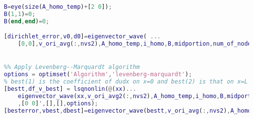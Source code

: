 \begin{lstlisting}[language=Matlab,caption=The Levenberg--Marquardt algorithm iteratively finds optimal macroscale Robin boundary conditions., label=matn1]
B=eye(size(A_homo_temp)+[2 0]);
B(1,1)=0;
B(end,end)=0;

[dirichlet_error,v0,d0]=eigenvector_wave( ...
    [0,0],v_ori_avg(:,nvs2),A_homo_temp,i_homo,B,midportion,num_of_node_in_a_period_perlayer);


%% Apply Levenberg--Marquardt algorithm
options = optimset('Algorithm','levenberg-marquardt');
% best(1) is the coefficient of dudx on x=0 and best(2) is that on x=L
[bestt,df_v_best] = lsqnonlin(@(xx)...
    eigenvector_wave(xx,v_ori_avg2(:,nvs2),A_homo_temp,i_homo,B,midportion,num_of_node_in_a_period_perlayer) ...
    ,[0 0]',[],[],options);
[besterror,vbest,dbest]=eigenvector_wave(bestt,v_ori_avg(:,nvs2),A_homo_temp,i_homo,B,midportion,num_of_node_in_a_period_perlayer);
\end{lstlisting}
